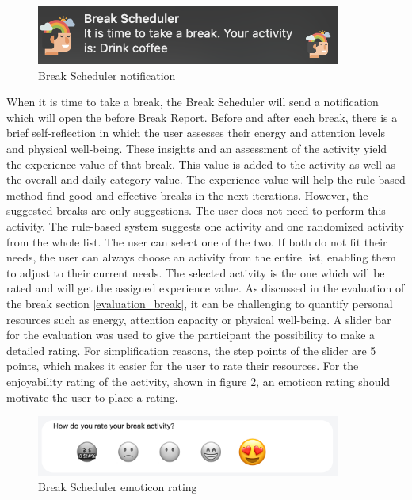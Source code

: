 \documentclass{hasel_thesis}
\begin{document}
\begin{figure}[htp]
    \centering
    \includegraphics[width=10cm]{hasel_thesis/images/notification.png}
    \caption{Break Scheduler notification}
    \label{fig:notification}
\end{figure}

When it is time to take a break, the Break Scheduler will send a notification which will open the before Break Report. Before and after each break, there is a brief self-reflection in which the user assesses their energy and attention levels and physical well-being. These insights and an assessment of the activity yield the experience value of that break. This value is added to the activity as well as the overall and daily category value. The experience value will help the rule-based method find good and effective breaks in the next iterations. However, the suggested breaks are only suggestions. The user does not need to perform this activity. The rule-based system suggests one activity and one randomized activity from the whole list. The user can select one of the two. If both do not fit their needs, the user can always choose an activity from the entire list, enabling them to adjust to their current needs. The selected activity is the one which will be rated and will get the assigned experience value. As discussed in the evaluation of the break section \ref{evaluation_break}, it can be challenging to quantify personal resources such as energy, attention capacity or physical well-being. A slider bar for the evaluation was used to give the participant the possibility to make a detailed rating. For simplification reasons, the step points of the slider are 5 points, which makes it easier for the user to rate their resources. For the enjoyability rating of the activity, shown in figure \ref{fig:rating}, an emoticon rating should motivate the user to place a rating.

\begin{figure}[htp]
    \centering
    \includegraphics[width=10cm]{hasel_thesis/images/rating.png}
    \caption{Break Scheduler emoticon rating}
    \label{fig:rating}
\end{figure}
\end{document}
